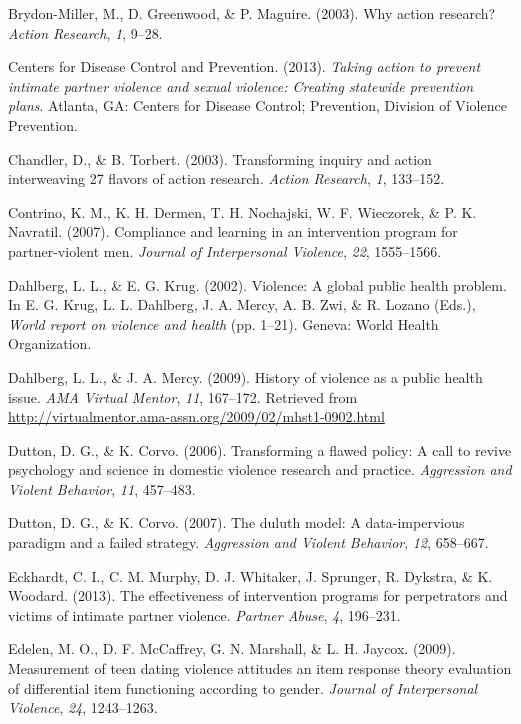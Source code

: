 \documentclass[11pt,]{tufte-book}
\begin{document}
\hypertarget{ref-brydon-miller2003why}{}
Brydon-Miller, M., D. Greenwood, \& P. Maguire. (2003). Why action
research? \emph{Action Research}, \emph{1}, 9--28.

\hypertarget{ref-centers2013taking}{}
Centers for Disease Control and Prevention. (2013). \emph{Taking action
to prevent intimate partner violence and sexual violence: Creating
statewide prevention plans}. Atlanta, GA: Centers for Disease Control;
Prevention, Division of Violence Prevention.

\hypertarget{ref-chandler2003transforming}{}
Chandler, D., \& B. Torbert. (2003). Transforming inquiry and action
interweaving 27 flavors of action research. \emph{Action Research},
\emph{1}, 133--152.

\hypertarget{ref-contrino2007compliance}{}
Contrino, K. M., K. H. Dermen, T. H. Nochajski, W. F. Wieczorek, \& P.
K. Navratil. (2007). Compliance and learning in an intervention program
for partner-violent men. \emph{Journal of Interpersonal Violence},
\emph{22}, 1555--1566.

\hypertarget{ref-dahlberg2002violence}{}
Dahlberg, L. L., \& E. G. Krug. (2002). Violence: A global public health
problem. In E. G. Krug, L. L. Dahlberg, J. A. Mercy, A. B. Zwi, \& R.
Lozano (Eds.), \emph{World report on violence and health} (pp. 1--21).
Geneva: World Health Organization.

\hypertarget{ref-dahlberg2009history}{}
Dahlberg, L. L., \& J. A. Mercy. (2009). History of violence as a public
health issue. \emph{AMA Virtual Mentor}, \emph{11}, 167--172. Retrieved
from \url{http://virtualmentor.ama-assn.org/2009/02/mhst1-0902.html}

\hypertarget{ref-dutton2006transforming}{}
Dutton, D. G., \& K. Corvo. (2006). Transforming a flawed policy: A call
to revive psychology and science in domestic violence research and
practice. \emph{Aggression and Violent Behavior}, \emph{11}, 457--483.

\hypertarget{ref-dutton2007duluth}{}
Dutton, D. G., \& K. Corvo. (2007). The duluth model: A data-impervious
paradigm and a failed strategy. \emph{Aggression and Violent Behavior},
\emph{12}, 658--667.

\hypertarget{ref-eckhardt2013effectiveness}{}
Eckhardt, C. I., C. M. Murphy, D. J. Whitaker, J. Sprunger, R. Dykstra,
\& K. Woodard. (2013). The effectiveness of intervention programs for
perpetrators and victims of intimate partner violence. \emph{Partner
Abuse}, \emph{4}, 196--231.

\hypertarget{ref-edelen2009measurement}{}
Edelen, M. O., D. F. McCaffrey, G. N. Marshall, \& L. H. Jaycox. (2009).
Measurement of teen dating violence attitudes an item response theory
evaluation of differential item functioning according to gender.
\emph{Journal of Interpersonal Violence}, \emph{24}, 1243--1263.
\end{document}
